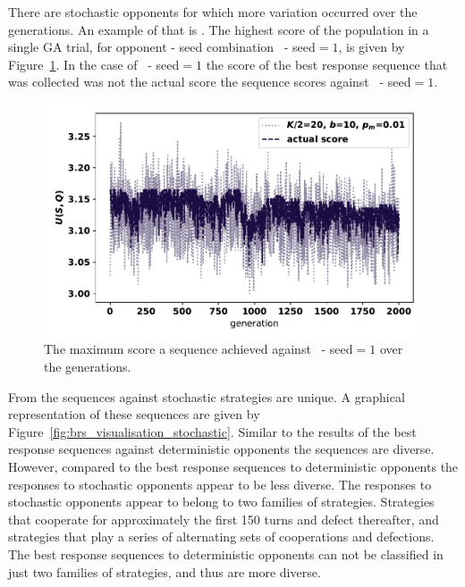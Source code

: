 There are stochastic opponents for which more variation occurred over the
generations. An example of that is \Random. The highest score
of the population in a single GA trial, for opponent - seed combination \Random~-
seed\(=1\), is given by Figure~\ref{fig:random_ga_score}.
In the case of \Random~- seed\(=1\) the score of the best response sequence that
was collected was not the actual score the sequence scores against \Random~-
seed\(=1\).

\begin{figure}[!htbp]
    \centering
    \includegraphics[width=.7\textwidth]{src/chapters/06/img/maximum_score_per_generation_random.pdf}
    \caption{The maximum score a sequence achieved against \Random~- seed\(=1\)
    over the generations.}\label{fig:random_ga_score}
\end{figure}

From the \stochasticsequences sequences against stochastic strategies \stochasticuniquesequences are unique.
A graphical representation of these
sequences are given by Figure~\ref{fig:brs_visualisation_stochastic}.
Similar to the results of the best response sequences against deterministic
opponents the sequences are diverse. However, compared to the best response
sequences to deterministic opponents the responses to stochastic opponents appear
to be less diverse. The responses to stochastic opponents appear to belong to two
families of strategies. Strategies that cooperate for approximately the first
150 turns and defect thereafter, and strategies that play a series of
alternating sets of cooperations and defections. The best response sequences to
deterministic opponents can not be classified in just two families of
strategies, and thus are more diverse.

